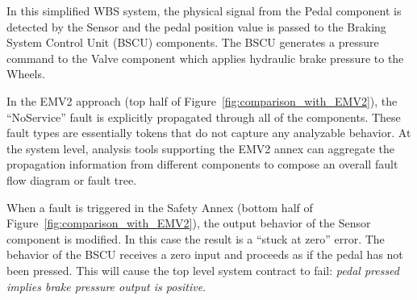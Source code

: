 In this simplified WBS system, the physical signal from the Pedal component is detected by the Sensor and the pedal position value is passed to the Braking System Control Unit (BSCU) components.  The BSCU generates a pressure command to the Valve component which applies hydraulic brake pressure to the Wheels. 

In the EMV2 approach (top half of Figure~\ref{fig:comparison_with_EMV2}), the ``NoService'' fault is explicitly propagated through all of the components. These fault types are essentially tokens that do not capture any analyzable behavior. At the system level, analysis tools supporting the EMV2 annex can aggregate the propagation information from different components to compose an overall fault flow diagram or fault tree. 

When a fault is triggered in the Safety Annex (bottom half of Figure~\ref{fig:comparison_with_EMV2}), the output behavior of the Sensor component is modified. In this case the result is a ``stuck at zero'' error. The behavior of the BSCU receives a zero input and proceeds as if the pedal has not been pressed. This will cause the top level system contract to fail: {\em pedal pressed implies brake pressure output is positive}.

